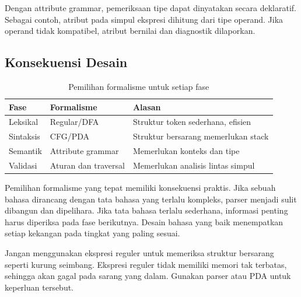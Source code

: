 Dengan attribute grammar, pemeriksaan tipe dapat dinyatakan secara
deklaratif. Sebagai contoh, atribut  pada simpul ekspresi
dihitung dari tipe operand. Jika operand tidak kompatibel, atribut
bernilai  dan diagnostik dilaporkan.

\subsection{Konsekuensi Desain}

\begin{table}[H]
\centering
\caption{Pemilihan formalisme untuk setiap fase}
\label{tab:ch04-formalisme}
\begin{tabularx}{\textwidth}{@{}l l X@{}}
\toprule
\textbf{Fase} & \textbf{Formalisme} & \textbf{Alasan} \\
\midrule
Leksikal & Regular/DFA & Struktur token sederhana, efisien \\
Sintaksis & CFG/PDA & Struktur bersarang memerlukan stack \\
Semantik & Attribute grammar & Memerlukan konteks dan tipe \\
Validasi & Aturan dan traversal & Memerlukan analisis lintas simpul \\
\bottomrule
\end{tabularx}
\end{table}

Pemilihan formalisme yang tepat memiliki konsekuensi praktis. Jika
sebuah bahasa dirancang dengan tata bahasa yang terlalu kompleks,
parser menjadi sulit dibangun dan dipelihara. Jika tata bahasa terlalu
sederhana, informasi penting harus diperiksa pada fase berikutnya.
Desain bahasa yang baik menempatkan setiap kekangan pada tingkat yang
paling sesuai.

\begin{warningbox}
Jangan menggunakan ekspresi reguler untuk memeriksa struktur
bersarang seperti kurung seimbang. Ekspresi reguler tidak memiliki
memori tak terbatas, sehingga akan gagal pada sarang yang dalam.
Gunakan parser atau PDA untuk keperluan tersebut.
\end{warningbox}
